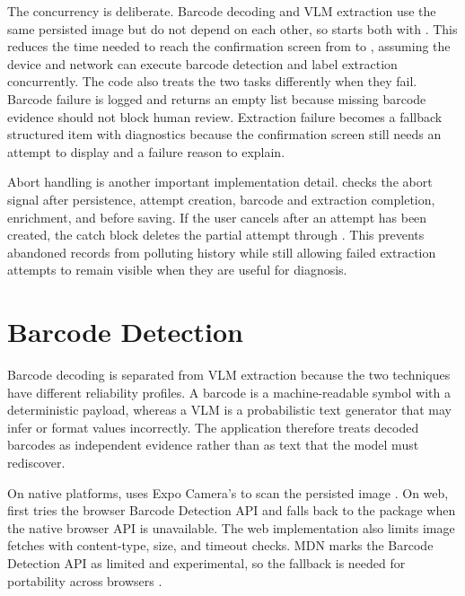 The concurrency is deliberate. Barcode decoding and VLM extraction use the same persisted image but do not depend on each other, so  starts both with . This reduces the time needed to reach the confirmation screen from  to , assuming the device and network can execute barcode detection and label extraction concurrently. The code also treats the two tasks differently when they fail. Barcode failure is logged and returns an empty list because missing barcode evidence should not block human review. Extraction failure becomes a fallback structured item with diagnostics because the confirmation screen still needs an attempt to display and a failure reason to explain.

Abort handling is another important implementation detail.  checks the abort signal after persistence, attempt creation, barcode and extraction completion, enrichment, and before saving. If the user cancels after an attempt has been created, the catch block deletes the partial attempt through . This prevents abandoned records from polluting history while still allowing failed extraction attempts to remain visible when they are useful for diagnosis.

\section{Barcode Detection}

Barcode decoding is separated from VLM extraction because the two techniques have different reliability profiles. A barcode is a machine-readable symbol with a deterministic payload, whereas a VLM is a probabilistic text generator that may infer or format values incorrectly. The application therefore treats decoded barcodes as independent evidence rather than as text that the model must rediscover.

On native platforms,  uses Expo Camera's  to scan the persisted image \cite{expo-camera}. On web,  first tries the browser Barcode Detection API and falls back to the  package when the native browser API is unavailable. The web implementation also limits image fetches with content-type, size, and timeout checks. MDN marks the Barcode Detection API as limited and experimental, so the fallback is needed for portability across browsers \cite{barcode-detection-api}.


